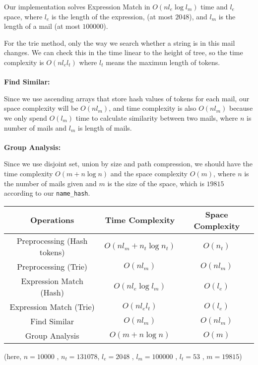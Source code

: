 \documentclass{article}
\begin{document}
Our implementation solves Expression Match in $O(n l_e \log l_m)$ time and $l_e$ space, where $l_e$ is the length of the expression, (at most $2048$), and $l_m$ is the length of a mail (at most $100000$).

For the trie method, only the way we search whether a string is in this mail changes. We can check this in the time linear to the height of tree, so the time complexity is $O(nl_el_t)$ where $l_t$ means the maximun length of tokens.\\ \\
\textbf{Find Similar:}

Since we use ascending arrays that store hash values of tokens for each mail, our space complexity will be $O(n l_m)$, and time complexity is also $O(n l_m)$ because we only spend $O(l_m)$ time to calculate similarity between two mails, where $n$ is number of mails and $l_m$ is length of mails.\\ \\
\textbf{Group Analysis:}

Since we use disjoint set, union by size and path compression, we should have the time complexity $O(m+n\log{n})$ and the space complexity $O(m)$, where $n$ is the number of mails given and $m$ is the size of the space, which is $19815$ according to our \verb|name_hash|.\\

\begin{center}
    \begin{tabular}{|c | c c|} 
    \hline
    Operations & Time Complexity & Space Complexity \\ 
    \hline
    Preprocessing (Hash tokens) & $O(nl_m + n_t\log{n_t})$ & $O(n_t)$ \\ 
    \hline
    Preprocessing (Trie) & $O(nl_m)$ & $O(nl_m)$ \\ 
    \hline
    Expression Match (Hash) & $O(n l_e \log l_m)$ & $O(l_e)$ \\ 
    \hline
    Expression Match (Trie) & $O(n l_e l_t)$ & $O(l_e)$ \\ 
    \hline
    Find Similar & $O(n l_m)$ & $O(n l_m)$ \\
    \hline
    Group Analysis & $O(m+n\log{n})$ & $O(m)$ \\
    \hline
    \end{tabular}

(here, $n = 10000$ , $n_t = 131078$, $l_e = 2048$ , $l_m = 100000$ , $l_t = 53$ , $m = 19815$)
\end{center}
\end{document}
